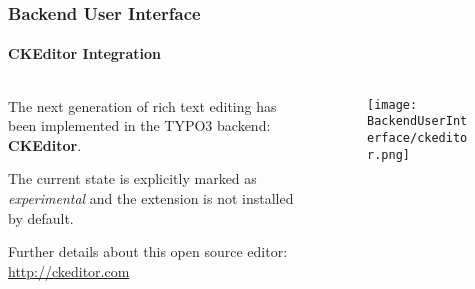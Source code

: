 \begin{frame}[fragile]
	\frametitle{Backend User Interface}
	\framesubtitle{CKEditor Integration}

	\begin{columns}[T]
		\begin{column}{.5\textwidth}
			The next generation of rich text editing has been implemented in the TYPO3 backend:
			\textbf{CKEditor}.\newline

			The current state is explicitly marked as \textit{experimental} and the extension
			is not installed by default.\newline

			Further details about this open source editor: \url{http://ckeditor.com}
		\end{column}
		\begin{column}{.5\textwidth}
			\begin{figure}\vspace*{-0.4cm}
				\texttt{[image: BackendUserInterface/ckeditor.png]}
			\end{figure}
		\end{column}
	\end{columns}

\end{frame}



